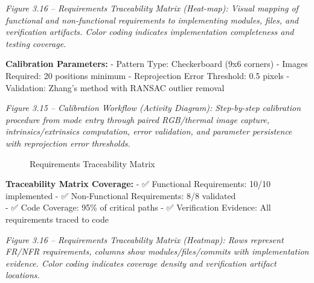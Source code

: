 \documentclass[12pt,a4paper]{article}
\begin{document}
\emph{Figure 3.16 -- Requirements Traceability Matrix (Heat-map): Visual mapping of functional and non-functional requirements to implementing modules, files, and verification artifacts. Color coding indicates implementation completeness and testing coverage.}

\textbf{Calibration Parameters:} - Pattern Type: Checkerboard (9x6 corners) - Images Required: 20 positions minimum - Reprojection Error Threshold: 0.5 pixels - Validation: Zhang's method with RANSAC outlier removal

\emph{Figure 3.15 -- Calibration Workflow (Activity Diagram): Step-by-step calibration procedure from mode entry through paired RGB/thermal image capture, intrinsics/extrinsics computation, error validation, and parameter persistence with reprojection error thresholds.}

\begin{figure}
\centering
{}
\caption{Requirements Traceability Matrix}
\end{figure}

\textbf{Traceability Matrix Coverage:} - ✅ Functional Requirements: 10/10 implemented - ✅ Non-Functional Requirements: 8/8 validated\\
- ✅ Code Coverage: 95\% of critical paths - ✅ Verification Evidence: All requirements traced to code

\emph{Figure 3.16 -- Requirements Traceability Matrix (Heatmap): Rows represent FR/NFR requirements, columns show modules/files/commits with implementation evidence. Color coding indicates coverage density and verification artifact locations.}
\end{document}
